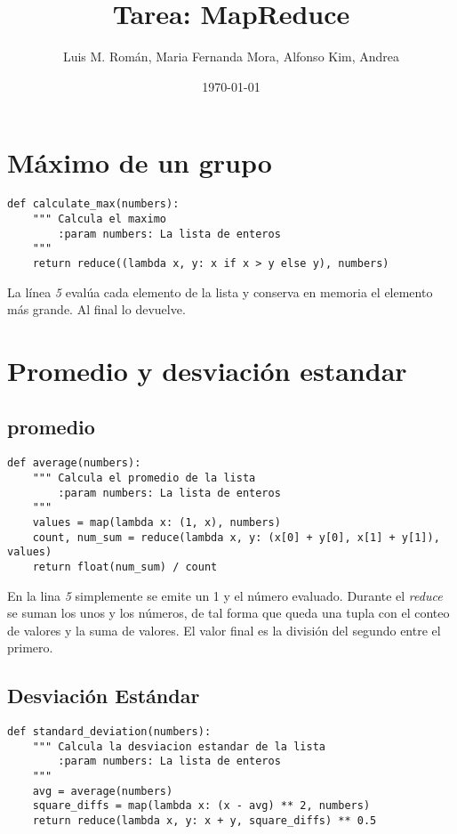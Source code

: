 \documentclass[12pt]{article}
\title{Tarea: MapReduce}
\author{Luis M. Román, Maria Fernanda Mora, Alfonso Kim, Andrea}
\date{\today}
\begin{document}
\maketitle

\section{Máximo de un grupo}

\begin{verbatim}
def calculate_max(numbers):
    """ Calcula el maximo
        :param numbers: La lista de enteros
    """
    return reduce((lambda x, y: x if x > y else y), numbers) 
\end{verbatim} 

La línea \textit{5} evalúa cada elemento de la lista y conserva en memoria el elemento más grande. Al final lo devuelve.\bigskip


\section{Promedio y desviación estandar}

\subsection{promedio}

\begin{verbatim}
def average(numbers):
    """ Calcula el promedio de la lista
        :param numbers: La lista de enteros
    """
    values = map(lambda x: (1, x), numbers)
    count, num_sum = reduce(lambda x, y: (x[0] + y[0], x[1] + y[1]), values)
    return float(num_sum) / count
\end{verbatim}  

En la lina \textit{5} simplemente se emite un 1 y el número evaluado. Durante el \textit{reduce} se suman los unos y los números, de tal forma que queda una tupla con el conteo de valores y la suma de valores. El valor final es la división del segundo entre el primero.

\subsection{Desviación Estándar}
\begin{verbatim}
def standard_deviation(numbers):
    """ Calcula la desviacion estandar de la lista
        :param numbers: La lista de enteros
    """
    avg = average(numbers)
    square_diffs = map(lambda x: (x - avg) ** 2, numbers)
    return reduce(lambda x, y: x + y, square_diffs) ** 0.5
\end{verbatim}  
\end{document}
